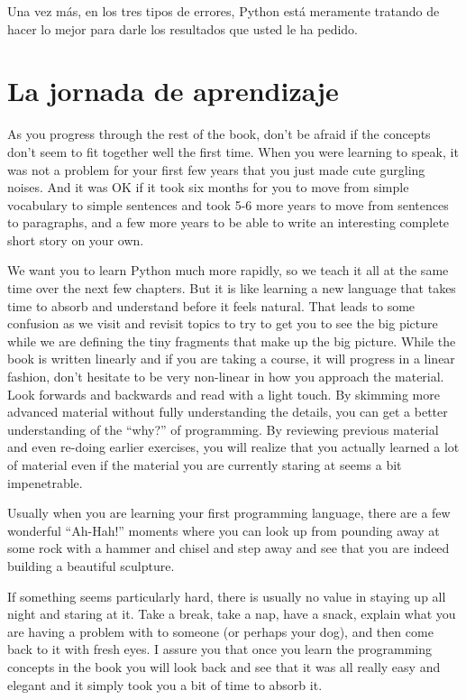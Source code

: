 Una vez m\'as, en los tres tipos de errores, Python est\'a meramente tratando de hacer lo mejor para darle los resultados que usted le ha pedido.

\section{La jornada de aprendizaje}

As you progress through the rest of the book, don't be afraid if the concepts 
don't seem to fit together well the first time.  When you were learning to speak, 
it was not a problem  for your first few years that you just made cute gurgling noises.
And it was OK if it took six months for you to move from simple vocabulary to 
simple sentences and took 5-6 more years to move from sentences to paragraphs, and a
few more years to be able to write an interesting complete short story on your own.

We want you to learn Python much more rapidly, so we teach it all at the same time
over the next few chapters.  
But it is like learning a new language that takes time to absorb and understand
before it feels natural.
That leads to some confusion as we visit and revisit
topics to try to get you to see the big picture while we are defining the tiny
fragments that make up the big picture.  While the book is written linearly and
if you are taking a course, it will progress in a linear fashion, don't hesitate
to be very non-linear in how you approach the material.  Look forwards and backwards
and read with a light touch.  By skimming more advanced material without 
fully understanding the details, you can get a better understanding of the ``why?'' 
of programming.  By reviewing previous material and even re-doing earlier 
exercises, you will realize that you actually learned a lot of material even 
if the material you are currently staring at seems a bit impenetrable.

Usually when you are learning your first programming language, there are a few
wonderful ``Ah-Hah!'' moments where you can look up from pounding away at some rock
with a hammer and chisel and step away and see that you are indeed building 
a beautiful sculpture.

If something seems particularly hard, there is usually no value in staying up all 
night and staring at it.   Take a break, take a nap, have a snack, explain what you 
are having a problem with to someone (or perhaps your dog), and then come back to it with
fresh eyes.  I assure you that once you learn the programming concepts in the book
you will look back and see that it was all really easy and elegant and it simply 
took you a bit of time to absorb it.

